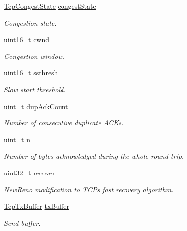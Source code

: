 \begin{DoxyCompactItemize}
\hyperlink{tcp_8h_ac69e0e40557f11fc979456965cdcd2f1}{Tcp\+Congest\+State} \hyperlink{struct__Socket_a4d8b137a67f0a4387a8253f18ad2d8e5}{congest\+State}
\begin{DoxyCompactList}\small\item\em Congestion state. \end{DoxyCompactList}\item 
\hyperlink{stdint_8h_a273cf69d639a59973b6019625df33e30}{uint16\+\_\+t} \hyperlink{struct__Socket_a46b793bed82a5d0fbdd301cbb6c6ee90}{cwnd}
\begin{DoxyCompactList}\small\item\em Congestion window. \end{DoxyCompactList}\item 
\hyperlink{stdint_8h_a273cf69d639a59973b6019625df33e30}{uint16\+\_\+t} \hyperlink{struct__Socket_ae6c17dc60d0ba6337b7a98a9244f06d5}{ssthresh}
\begin{DoxyCompactList}\small\item\em Slow start threshold. \end{DoxyCompactList}\item 
\hyperlink{compiler__port_8h_a12a1e9b3ce141648783a82445d02b58d}{uint\+\_\+t} \hyperlink{struct__Socket_a7ed4d702f4bfdc9f60a73501b81474ff}{dup\+Ack\+Count}
\begin{DoxyCompactList}\small\item\em Number of consecutive duplicate A\+C\+Ks. \end{DoxyCompactList}\item 
\hyperlink{compiler__port_8h_a12a1e9b3ce141648783a82445d02b58d}{uint\+\_\+t} \hyperlink{struct__Socket_a1ead06c4cf339fa577569a36eba7b2f7}{n}
\begin{DoxyCompactList}\small\item\em Number of bytes acknowledged during the whole round-\/trip. \end{DoxyCompactList}\item 
\hyperlink{stdint_8h_a435d1572bf3f880d55459d9805097f62}{uint32\+\_\+t} \hyperlink{struct__Socket_aa15e14d2e198b45eeeb9887d39e5bfb2}{recover}
\begin{DoxyCompactList}\small\item\em New\+Reno modification to T\+CP\textquotesingle{}s fast recovery algorithm. \end{DoxyCompactList}\item 
\hyperlink{structTcpTxBuffer}{Tcp\+Tx\+Buffer} \hyperlink{struct__Socket_aeebd69c2f369e17e13d23bbd620b71c9}{tx\+Buffer}
\begin{DoxyCompactList}\small\item\em Send buffer. \end{DoxyCompactList}\item 

\end{DoxyCompactItemize}
